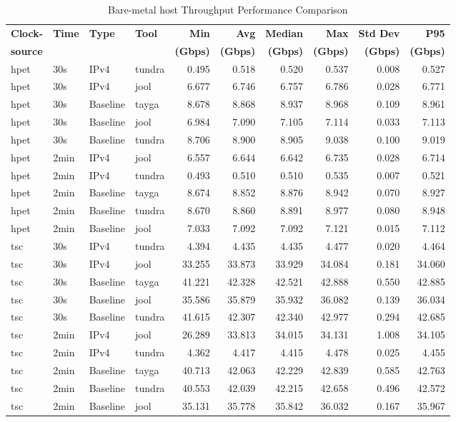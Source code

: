 \begin{table}[htbp]
\centering
\caption{Bare-metal host Throughput Performance Comparison}
\label{tab:throughput_comparison_localsingle}
\footnotesize
\begin{tabular}{|l|l|l|l|r|r|r|r|r|r|}
\hline
\textbf{Clock-} & \textbf{Time} & \textbf{Type} & \textbf{Tool} & \textbf{Min} & \textbf{Avg} & \textbf{Median} & \textbf{Max} & \textbf{Std Dev} & \textbf{P95} \\
\textbf{source} & & & & \textbf{(Gbps)} & \textbf{(Gbps)} & \textbf{(Gbps)} & \textbf{(Gbps)} & \textbf{(Gbps)} & \textbf{(Gbps)} \\
\hline
hpet & 30s & IPv4 & tundra & 0.495 & 0.518 & 0.520 & 0.537 & 0.008 & 0.527 \\
hpet & 30s & IPv4 & jool & 6.677 & 6.746 & 6.757 & 6.786 & 0.028 & 6.771 \\
hpet & 30s & Baseline & tayga & 8.678 & 8.868 & 8.937 & 8.968 & 0.109 & 8.961 \\
hpet & 30s & Baseline & jool & 6.984 & 7.090 & 7.105 & 7.114 & 0.033 & 7.113 \\
hpet & 30s & Baseline & tundra & 8.706 & 8.900 & 8.905 & 9.038 & 0.100 & 9.019 \\
hpet & 2min & IPv4 & jool & 6.557 & 6.644 & 6.642 & 6.735 & 0.028 & 6.714 \\
hpet & 2min & IPv4 & tundra & 0.493 & 0.510 & 0.510 & 0.535 & 0.007 & 0.521 \\
hpet & 2min & Baseline & tayga & 8.674 & 8.852 & 8.876 & 8.942 & 0.070 & 8.927 \\
hpet & 2min & Baseline & tundra & 8.670 & 8.860 & 8.891 & 8.977 & 0.080 & 8.948 \\
hpet & 2min & Baseline & jool & 7.033 & 7.092 & 7.092 & 7.121 & 0.015 & 7.112 \\
\hline
tsc & 30s & IPv4 & tundra & 4.394 & 4.435 & 4.435 & 4.477 & 0.020 & 4.464 \\
tsc & 30s & IPv4 & jool & 33.255 & 33.873 & 33.929 & 34.084 & 0.181 & 34.060 \\
tsc & 30s & Baseline & tayga & 41.221 & 42.328 & 42.521 & 42.888 & 0.550 & 42.885 \\
tsc & 30s & Baseline & jool & 35.586 & 35.879 & 35.932 & 36.082 & 0.139 & 36.034 \\
tsc & 30s & Baseline & tundra & 41.615 & 42.307 & 42.340 & 42.977 & 0.294 & 42.685 \\
tsc & 2min & IPv4 & jool & 26.289 & 33.813 & 34.015 & 34.131 & 1.008 & 34.105 \\
tsc & 2min & IPv4 & tundra & 4.362 & 4.417 & 4.415 & 4.478 & 0.025 & 4.455 \\
tsc & 2min & Baseline & tayga & 40.713 & 42.063 & 42.229 & 42.839 & 0.585 & 42.763 \\
tsc & 2min & Baseline & tundra & 40.553 & 42.039 & 42.215 & 42.658 & 0.496 & 42.572 \\
tsc & 2min & Baseline & jool & 35.131 & 35.778 & 35.842 & 36.032 & 0.167 & 35.967 \\
\hline
\end{tabular}
\end{table}

